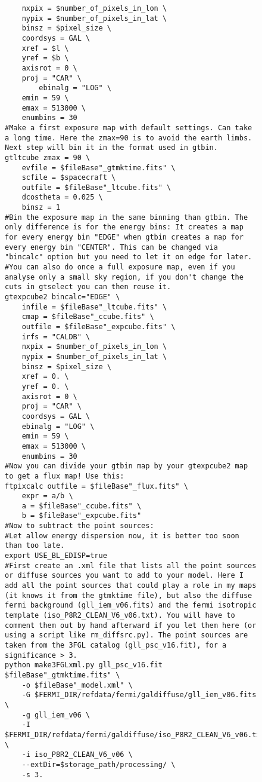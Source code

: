 \begin{figure}
\begin{lstlisting}
	nxpix = $number_of_pixels_in_lon \
	nypix = $number_of_pixels_in_lat \
	binsz = $pixel_size \
	coordsys = GAL \
	xref = $l \
	yref = $b \
	axisrot = 0 \
	proj = "CAR" \
       	ebinalg = "LOG" \
	emin = 59 \
	emax = 513000 \
	enumbins = 30
#Make a first exposure map with default settings. Can take a long time. Here the zmax=90 is to avoid the earth limbs. Next step will bin it in the format used in gtbin. 
gtltcube zmax = 90 \
	evfile = $fileBase"_gtmktime.fits" \
	scfile = $spacecraft \
	outfile = $fileBase"_ltcube.fits" \
	dcostheta = 0.025 \
	binsz = 1
#Bin the exposure map in the same binning than gtbin. The only difference is for the energy bins: It creates a map for every energy bin "EDGE" when gtbin creates a map for every energy bin "CENTER". This can be changed via "bincalc" option but you need to let it on edge for later.
#You can also do once a full exposure map, even if you analyse only a small sky region, if you don't change the cuts in gtselect you can then reuse it.
gtexpcube2 bincalc="EDGE" \
	infile = $fileBase"_ltcube.fits" \
	cmap = $fileBase"_ccube.fits" \
	outfile = $fileBase"_expcube.fits" \
	irfs = "CALDB" \
	nxpix = $number_of_pixels_in_lon \
	nypix = $number_of_pixels_in_lat \
	binsz = $pixel_size \
	xref = 0. \
	yref = 0. \
	axisrot = 0 \
	proj = "CAR" \
	coordsys = GAL \
	ebinalg = "LOG" \
	emin = 59 \
	emax = 513000 \
	enumbins = 30
#Now you can divide your gtbin map by your gtexpcube2 map to get a flux map! Use this:
ftpixcalc outfile = $fileBase"_flux.fits" \
    expr = a/b \
    a = $fileBase"_ccube.fits" \
    b = $fileBase"_expcube.fits"
#Now to subtract the point sources:
#Let allow energy dispersion now, it is better too soon than too late.
export USE_BL_EDISP=true
#First create an .xml file that lists all the point sources or diffuse sources you want to add to your model. Here I add all the point sources that could play a role in my maps (it knows it from the gtmktime file), but also the diffuse fermi background (gll_iem_v06.fits) and the fermi isotropic template (iso_P8R2_CLEAN_V6_v06.txt). You will have to comment them out by hand afterward if you let them here (or using a script like rm_diffsrc.py). The point sources are taken from the 3FGL catalog (gll_psc_v16.fit), for a significance > 3.
python make3FGLxml.py gll_psc_v16.fit $fileBase"_gtmktime.fits" \
    -o $fileBase"_model.xml" \
    -G $FERMI_DIR/refdata/fermi/galdiffuse/gll_iem_v06.fits \
    -g gll_iem_v06 \
    -I $FERMI_DIR/refdata/fermi/galdiffuse/iso_P8R2_CLEAN_V6_v06.txt \
    -i iso_P8R2_CLEAN_V6_v06 \
    --extDir=$storage_path/processing/ \
    -s 3.

\end{lstlisting}
\end{figure}
